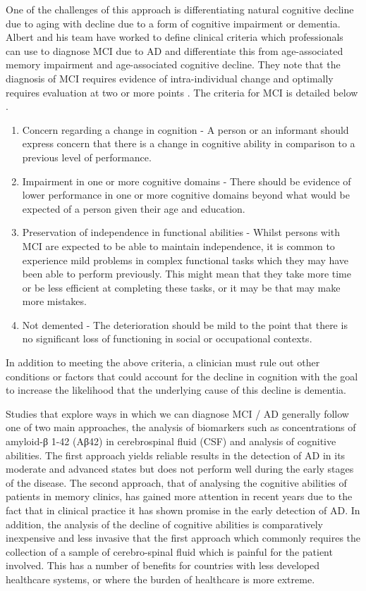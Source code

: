 \par
One of the challenges of this approach is differentiating natural cognitive decline due to aging with decline due to a form of cognitive impairment or dementia. Albert and his team have worked to define clinical criteria which professionals can use to diagnose MCI due to AD and differentiate this from age-associated memory impairment and age-associated cognitive decline. They note that the diagnosis of MCI requires evidence of intra-individual change and optimally requires evaluation at two or more points \cite{Albert2011}. The criteria for MCI is detailed below \cite{Albert2011}.
\begin{enumerate}
	\item Concern regarding a change in cognition - A person or an informant should express concern that there is a change in cognitive ability in comparison to a previous level of performance.
	\item Impairment in one or more cognitive domains - There should be evidence of lower performance in one or more cognitive domains beyond what would be expected of a person given their age and education. 
	\item Preservation of independence in functional abilities - Whilst persons with MCI are expected to be able to maintain independence, it is common to experience mild problems in complex functional tasks which they may have been able to perform previously. This might mean that they take more time or be less efficient at completing these tasks, or it may be that may make more mistakes.
	\item Not demented - The deterioration should be mild to the point that there is no significant loss of functioning in social or occupational contexts.
\end{enumerate}
In addition to meeting the above criteria, a clinician must rule out other conditions or factors that could account for the decline in cognition with the goal to increase the likelihood that the underlying cause of this decline is dementia. 
\par
Studies that explore ways in which we can diagnose MCI / AD generally follow one of two main approaches, the analysis of biomarkers such as concentrations of amyloid-β 1-42 (Aβ42) in cerebrospinal fluid (CSF) and analysis of cognitive abilities. The first approach yields reliable results in the detection of AD in its moderate and advanced states but does not perform well during the early stages of the disease. The second approach, that of analysing the cognitive abilities of patients in memory clinics, has gained more attention in recent years due to the fact that in clinical practice it has shown promise in the early detection of AD. In addition, the analysis of the decline of cognitive abilities is comparatively inexpensive and less invasive that the first approach which commonly requires the collection of a sample of cerebro-spinal fluid which is painful for the patient involved. This has a number of benefits for countries with less developed healthcare systems, or where the burden of healthcare is more extreme. 
